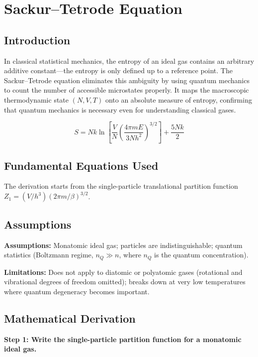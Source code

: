 \chapter{Sackur--Tetrode Equation}

\section*{Introduction}

In classical statistical mechanics, the entropy of an ideal gas contains an arbitrary additive constant---the entropy is only defined up to a reference point. The Sackur--Tetrode equation eliminates this ambiguity by using quantum mechanics to count the number of accessible microstates properly. It maps the macroscopic thermodynamic state $(N, V, T)$ onto an absolute measure of entropy, confirming that quantum mechanics is necessary even for understanding classical gases.


\begin{equation}
S = Nk\ln\left[\frac{V}{N}\left(\frac{4\pi m E}{3Nh^2}\right)^{3/2}\right] + \frac{5Nk}{2}
\end{equation}

\section*{Fundamental Equations Used}

The derivation starts from the single-particle translational partition function $Z_1 = (V/h^3)(2\pi m/\beta)^{3/2}$.

\section*{Assumptions}

\textbf{Assumptions:} Monatomic ideal gas; particles are indistinguishable; quantum statistics (Boltzmann regime, $n_Q \gg n$, where $n_Q$ is the quantum concentration).


\textbf{Limitations:} Does not apply to diatomic or polyatomic gases (rotational and vibrational degrees of freedom omitted); breaks down at very low temperatures where quantum degeneracy becomes important.


\section*{Mathematical Derivation}

\textbf{Step 1: Write the single-particle partition function for a monatomic ideal gas.}

